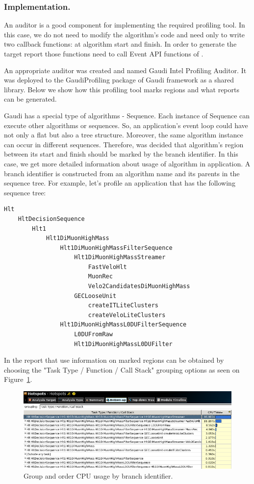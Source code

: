 \documentclass[a4paper]{jpconf}
\begin{document}
\subsubsection{Implementation.}

An auditor is a good component for implementing the required profiling tool. In this case, we do not need to modify the algorithm’s code and need only to write two callback functions: at algorithm start and finish. In order to generate the target report those functions need to call Event API functions of \amp.

An appropriate auditor was created and named Gaudi Intel Profiling Auditor. It was deployed to the GaudiProfiling package of Gaudi framework as a shared library. Below we show how this profiling tool marks regions and what reports can be generated.

Gaudi has a special type of algorithms - Sequence. Each instance of Sequence can execute other algorithms or sequences. So, an application’s event loop could have not only a flat but also a tree structure. Moreover, the same algorithm instance can occur in different sequences. Therefore, was decided that algorithm’s region between its start and finish should be marked by the branch identifier. In this case, we get more detailed information about usage of algorithm in application. A branch identifier is constructed from an algorithm name and its parents in the sequence tree. For example, let’s profile an application that has the following sequence tree:
\begin{verbatim}
Hlt 
    HltDecisionSequence 
        Hlt1 
            Hlt1DiMuonHighMass
                Hlt1DiMuonHighMassFilterSequence
                    Hlt1DiMuonHighMassStreamer
                        FastVeloHlt
                        MuonRec
                        Velo2CandidatesDiMuonHighMass
                    GECLooseUnit
                        createITLiteClusters
                        createVeloLiteClusters
                Hlt1DiMuonHighMassL0DUFilterSequence
                    L0DUFromRaw
                    Hlt1DiMuonHighMassL0DUFilter
\end{verbatim}

In \amp the report that use information on marked regions can be obtained by choosing the "Task Type / Function / Call Stack" grouping options as seen on Figure~\ref{fig08}.

\begin{figure}[H]
\begin{minipage}{\textwidth}
\includegraphics[width=\textwidth]{figs/fig08.png}
\caption{\label{fig08}Group and order CPU usage by branch identifier.}
\end{minipage}
\end{figure}
\end{document}
